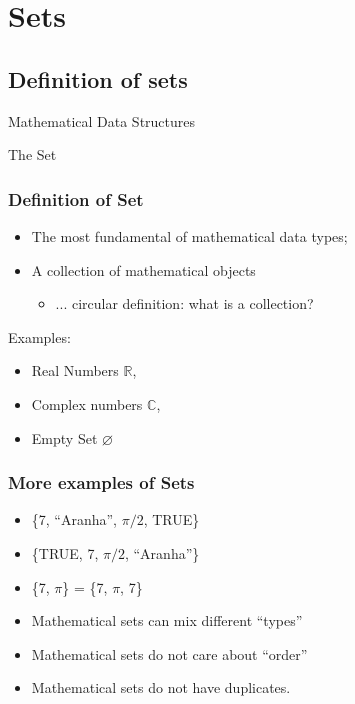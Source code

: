\documentclass{beamer}
\begin{document}
\section{Sets}
\subsection{Definition of sets}

\begin{frame}
  
  \begin{center}
    {\larger
      Mathematical Data Structures

      \bigskip
      
      The Set
    }
  \end{center}
\end{frame}

\begin{frame}
  \frametitle{Definition of Set}

  {\larger
  \begin{itemize}
  \item The most fundamental of mathematical data types;
  \item A \alert{collection} of mathematical objects
    \begin{itemize}
    \item ... circular definition: what is a collection?
    \end{itemize}
  \end{itemize}

  \vfill

  Examples:
  \begin{itemize}
  \item Real Numbers $\mathbb{R}$,
  \item Complex numbers $\mathbb{C}$,
  \item Empty Set $\varnothing$
  \end{itemize}  
  }
\end{frame}

\begin{frame}
  \frametitle{More examples of Sets}

  {\larger
    \begin{itemize}
    \item \{7, ``Aranha'', $\pi/2$, TRUE\}
    \item \{TRUE, 7, $\pi/2$, ``Aranha''\}
    \item \{7, $\pi$\} = \{7, $\pi$, 7\}
    \end{itemize}

    \vfill

    \begin{itemize}
    \item Mathematical sets can mix different ``types''
    \item Mathematical sets do not care about ``order''
    \item Mathematical sets do not have duplicates.
    \end{itemize}
  }
\end{frame}
\end{document}
